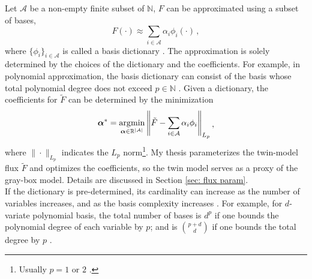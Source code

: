 Let $\mathcal{A}$ be a non-empty finite subset of $\mathbb{N}$,
$F$ can be approximated using a subset of bases, 
\begin{equation}
    F(\cdot) \approx \sum_{i\in \mathcal{A}} {\alpha_i} \phi_i(\cdot)\,,
    \label{eqn: linear param truncate}
\end{equation}
where $\{\phi_i\}_{i\in \mathcal{A}}$ is called a basis dictionary \cite{match pursuit}. 
The approximation is solely determined by the choices of the dictionary and the coefficients.
For example, in polynomial approximation, the basis dictionary can consist of
the basis whose total polynomial degree does not exceed $p\in \mathbb{N}$ \cite{PCE}.
Given a dictionary, the coefficients for $\tilde{F}$
can be determined by the minimization \cite{PCE}
\begin{equation}\begin{split}
    \boldsymbol{\alpha}^* = \operatorname*{\arg\!\min}_{\boldsymbol{\alpha}\in \mathbb{R}^{|\mathcal{A}|}}
    \left\| \tilde{F}-\sum_{i\in \mathcal{A}} \alpha_i \phi_i \right\|_{L_p}
\end{split}\,,
\label{eqn: least squares demo}
\end{equation}
where $\|\cdot\|_{L_p}$ indicates the $L_p$ norm\footnote{
    Usually $p=1$ \cite{L1 basis pursuit} or $2$ \cite{L2 frame, match pursuit}.
}.
My thesis parameterizes the twin-model flux $\tilde{F}$ and
optimizes the coefficients,
so the twin model serves as a proxy of the gray-box model. Details are discussed in 
Section \ref{sec: flux param}.\\

If the dictionary is pre-determined,
its cardinality can increase as the number of variables increases, and
as the basis complexity increases \cite{PCE}.
For example, for $d$-variate polynomial basis, the total number of bases 
is $d^p$ if one bounds the polynomial degree of each variable by $p$; and 
is $\binom{p+d}{d}$ if one bounds the total degree by $p$ \cite{PCE}.\\


